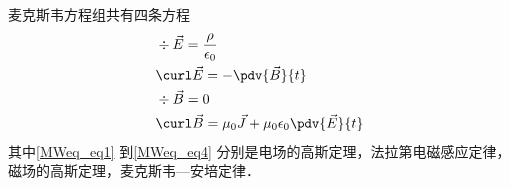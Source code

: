
麦克斯韦方程组共有四条方程
\begin{align}
\label{MWeq_eq1}
&\div \vec E = \frac{\rho}{\epsilon_0}\\
\label{MWeq_eq2}
&\curl \vec E = -\pdv{\vec B}{t}\\
\label{MWeq_eq3}
&\div \vec B = 0 \\
\label{MWeq_eq4}
&\curl \vec B = \mu_0 \vec J + \mu_0\epsilon_0 \pdv{\vec E}{t}
\end{align}
其中\autoref{MWeq_eq1} 到\autoref{MWeq_eq4} 分别是电场的高斯定理，法拉第电磁感应定律，磁场的高斯定理，麦克斯韦—安培定律．%
